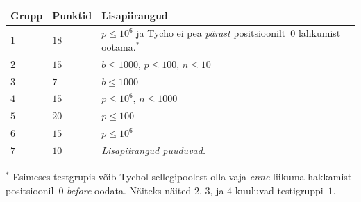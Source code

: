 \medskip
\begin{tabular}{lll}
Grupp & Punktid & Lisapiirangud \\\hline
  $1$ & $18$  & $p\leq 10^6$ ja Tycho ei pea \emph{pärast} positsioonilt~$0$ lahkumist ootama.$^*$ \\ %
  $2$ & $15$  & $b\leq 1000$, $p\leq 100$, $n\leq 10$ \\
  $3$ & $7$  & $b\leq 1000$ \\
  $4$ & $15$ & $p\leq 10^6$, $n\leq 1000$\\
  $5$ & $20$ & $p\leq 100$\\
  $6$ & $15$ & $p\leq 10^6$\\
  $7$ & $10$ & \emph{Lisapiirangud puuduvad.}
\end{tabular}

\medskip
\noindent $^*$ Esimeses testgrupis võib Tychol sellegipoolest olla vaja \emph{enne} liikuma hakkamist positsioonil~$0$ \emph{before} oodata.
Näiteks näited $2$, $3$, ja $4$ kuuluvad testigruppi~$1$.
